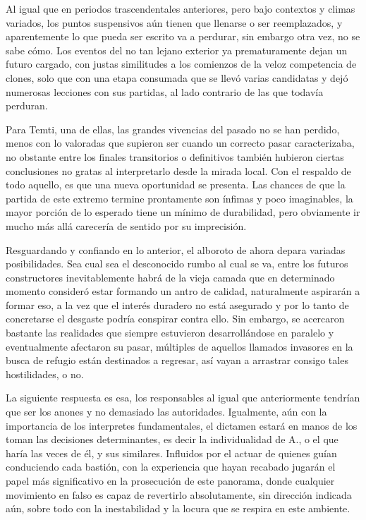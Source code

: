 \documentclass[
]{book}
\begin{document}
Al igual que en periodos trascendentales anteriores, pero bajo contextos y climas variados, los puntos suspensivos aún tienen que llenarse o ser reemplazados, y aparentemente lo que pueda ser escrito va a perdurar, sin embargo otra vez, no se sabe cómo. Los eventos del no tan lejano exterior ya prematuramente dejan un futuro cargado, con justas similitudes a los comienzos de la veloz competencia de clones, solo que con una etapa consumada que se llevó varias candidatas y dejó numerosas lecciones con sus partidas, al lado contrario de las que todavía perduran.

Para Temti, una de ellas, las grandes vivencias del pasado no se han perdido, menos con lo valoradas que supieron ser cuando un correcto pasar caracterizaba, no obstante entre los finales transitorios o definitivos también hubieron ciertas conclusiones no gratas al interpretarlo desde la mirada local. Con el respaldo de todo aquello, es que una nueva oportunidad se presenta. Las chances de que la partida de este extremo termine prontamente son ínfimas y poco imaginables, la mayor porción de lo esperado tiene un mínimo de durabilidad, pero obviamente ir mucho más allá carecería de sentido por su imprecisión.

Resguardando y confiando en lo anterior, el alboroto de ahora depara variadas posibilidades. Sea cual sea el desconocido rumbo al cual se va, entre los futuros constructores inevitablemente habrá de la vieja camada que en determinado momento consideró estar formando un antro de calidad, naturalmente aspirarán a formar eso, a la vez que el interés duradero no está asegurado y por lo tanto de concretarse el desgaste podría conspirar contra ello. Sin embargo, se acercaron bastante las realidades que siempre estuvieron desarrollándose en paralelo y eventualmente afectaron su pasar, múltiples de aquellos llamados invasores en la busca de refugio están destinados a regresar, así vayan a arrastrar consigo tales hostilidades, o no.

La siguiente respuesta es esa, los responsables al igual que anteriormente tendrían que ser los anones y no demasiado las autoridades. Igualmente, aún con la importancia de los interpretes fundamentales, el dictamen estará en manos de los toman las decisiones determinantes, es decir la individualidad de A., o el que haría las veces de él, y sus similares. Influidos por el actuar de quienes guían conduciendo cada bastión, con la experiencia que hayan recabado jugarán el papel más significativo en la prosecución de este panorama, donde cualquier movimiento en falso es capaz de revertirlo absolutamente, sin dirección indicada aún, sobre todo con la inestabilidad y la locura que se respira en este ambiente.
\end{document}
